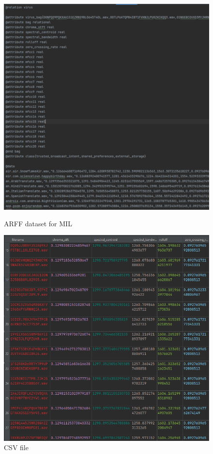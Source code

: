 \begin{figure}[h]
   \begin{minipage}{0.48\textwidth}
     \centering
     \includegraphics[width=0.85\linewidth]{imgs/capitolo4/ARFF.png}
     \caption{ARFF dataset for MIL}
     \label{Fig:Dataarff}
   \end{minipage}\hfill
   \begin{minipage}{0.48\textwidth}
     \centering
     \includegraphics[width=0.85\linewidth]{imgs/capitolo4/csv.png}
     \caption{CSV file}
     \label{Fig:Datacsv}
   \end{minipage}
\end{figure}
\FloatBarrier 

